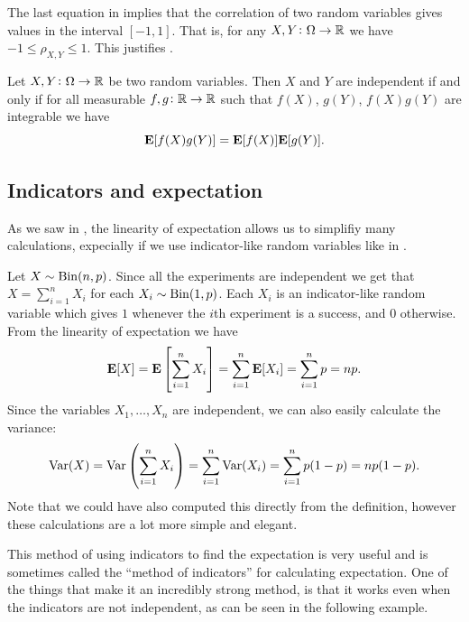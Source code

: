 \documentclass[11pt,a4paper]{article}
\begin{document}
\begin{remark}
  The last equation in 
  implies that the correlation of two random variables
  gives values in the interval $[-1,1]$. 
  That is, for any $X,Y \colon \Omega \to \mathbb{R}$ we have 
  $-1 \le \rho_{X,Y} \le 1$.
  This justifies .
\end{remark}

\begin{proposition}
  Let $X,Y \colon \Omega \to \mathbb{R}$ be two random variables.
  Then $X$ and $Y$ are independent if and only if for all measurable
  $f,g \colon \mathbb{R} \to \mathbb{R}$ such that $f(X)$, $g(Y)$, $f(X)g(Y)$ are
  integrable we have
  \[
    \mathbf{E}[f(X)g(Y)] = \mathbf{E}[f(X)] \mathbf{E}[g(Y)].
  \]
\end{proposition}

\subsection{Indicators and expectation}

As we saw in ,
the linearity of expectation allows us to simplifiy many
calculations,
expecially if we use indicator-like random variables like
in .

\begin{example}
  Let $X \sim \operatorname{Bin}(n,p)$.
  Since all the experiments are independent
  we get that $X = \sum_{i=1}^{n} X_i$ for each $X_i \sim \operatorname{Bin}(1,p)$.
  Each $X_i$ is an indicator-like random variable which
  gives $1$ whenever the $i$th experiment is a success, and $0$ otherwise.
  From the linearity of expectation we have
  \[
    \mathbf{E}[X] =
    \mathbf{E}\left[\sum_{i=1}^{n} X_i\right] =
    \sum_{i=1}^{n} \mathbf{E}[X_i] =
    \sum_{i=1}^{n} p =
    np.
  \]
  Since the variables $X_1,\dots,X_n$
  are independent,
  we can also easily calculate the variance:
  \[
    \operatorname{Var}(X) =
    \operatorname{Var}\left(\sum_{i=1}^{n} X_i\right) =
    \sum_{i=1}^{n} \operatorname{Var}(X_i) =
    \sum_{i=1}^{n} p(1-p) =
    n p(1-p).
  \]
  Note that we could have also computed this directly from the definition,
  however these calculations are a lot more simple and elegant.
\end{example}

\begin{remark}
  This method of using indicators to find the expectation is very useful
  and is sometimes called the ``method of indicators''
  for calculating expectation.
  One of the things that make it an incredibly strong method,
  is that it works even when the indicators are not independent,
  as can be seen in the following example.
\end{remark}
\end{document}
